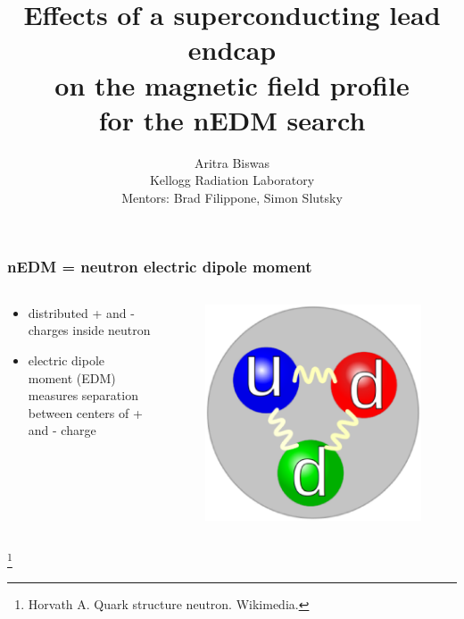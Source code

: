 \documentclass[handout]{beamer}
\newcommand{\bottomcite}{\let\thefootnote\relax\footnote}
\begin{document}

\title{Effects of a superconducting lead endcap\\ on the magnetic field profile \\ for the nEDM search}
\author{Aritra Biswas\\Kellogg Radiation Laboratory\\Mentors: Brad Filippone, Simon Slutsky}
\maketitle

\begin{frame}
\frametitle{nEDM = neutron electric dipole moment}

    \begin{columns}

    \begin{column}{0.5\textwidth}
    \begin{itemize}
        \item distributed + and - charges inside neutron
        \item electric dipole moment (EDM) measures separation between
              centers of + and - charge
    \end{itemize}
    \end{column}
    
    \begin{column}{0.5\textwidth}
    \begin{figure}
    \includegraphics[width=\textwidth]{figures/neutron_quarks.eps}
    \end{figure}
    \end{column}

    \end{columns}

    \bottomcite{Horvath A. Quark structure neutron. Wikimedia.}

\end{frame}
\end{document}
